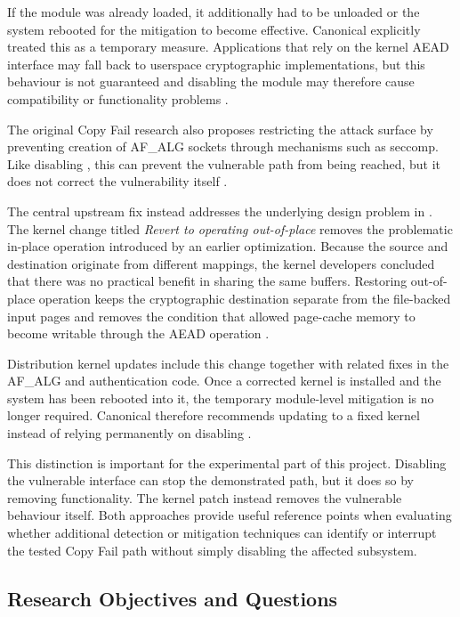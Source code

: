 If the module was already loaded, it additionally had to be unloaded or the
system rebooted for the mitigation to become effective. Canonical explicitly
treated this as a temporary measure. Applications that rely on the kernel AEAD
interface may fall back to userspace cryptographic implementations, but this
behaviour is not guaranteed and disabling the module may therefore cause
compatibility or functionality problems
\cite{ubuntu-copyfail-fixes}.

The original Copy Fail research also proposes restricting the attack surface by
preventing creation of AF\_ALG sockets through mechanisms such as seccomp. Like
disabling , this can prevent the vulnerable path from being
reached, but it does not correct the vulnerability itself
\cite{copyfail-research}.

The central upstream fix instead addresses the underlying design problem in
. The kernel change titled
\emph{Revert to operating out-of-place} removes the problematic in-place
operation introduced by an earlier optimization. Because the source and
destination originate from different mappings, the kernel developers concluded
that there was no practical benefit in sharing the same buffers. Restoring
out-of-place operation keeps the cryptographic destination separate from the
file-backed input pages and removes the condition that allowed page-cache memory
to become writable through the AEAD operation
\cite{linux-copyfail-fix}.

Distribution kernel updates include this change together with related fixes in
the AF\_ALG and authentication code. Once a corrected kernel is installed and
the system has been rebooted into it, the temporary module-level mitigation is
no longer required. Canonical therefore recommends updating to a fixed kernel
instead of relying permanently on disabling 
\cite{ubuntu-copyfail-fixes}.

This distinction is important for the experimental part of this project.
Disabling the vulnerable interface can stop the demonstrated path, but it does
so by removing functionality. The kernel patch instead removes the vulnerable
behaviour itself. Both approaches provide useful reference points when
evaluating whether additional detection or mitigation techniques can identify
or interrupt the tested Copy Fail path without simply disabling the affected
subsystem.

\subsection{Research Objectives and Questions}

